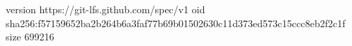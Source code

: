 version https://git-lfs.github.com/spec/v1
oid sha256:f57159652ba2b264b6a3faf77b69b01502630c11d373ed573c15ccc8eb2f2c1f
size 699216
